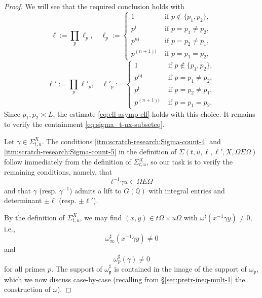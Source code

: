\documentclass[reqno]{amsart}
\theoremstyle{plain} \newtheorem{theorem} {Theorem}
\theoremstyle{definition} \newtheorem{definition} [theorem] {Definition}
\theoremstyle{itplain} %
\numberwithin{equation}{section}
\numberwithin{theorem}{section}
\begin{document}
\begin{proof}
  We will see that the required conclusion holds with
  \begin{equation*}
    \ell := \prod_p \ell_p, \quad
    \ell_p := \begin{cases}
      1 & \text{ if } p \notin \{p_1, p_2\}, \\
      p^{\mathfrak{j}} & \text{ if } p = p_1 \neq p _2, \\
      p ^{n \mathfrak{j} } &  \text{ if } p = p_2 \neq p_1, \\
      p ^{(n + 1) \mathfrak{j} } &  \text{ if } p = p_1 = p_2,
    \end{cases}
  \end{equation*}
  \begin{equation*}
    \ell ' := \prod_p \ell '_p, \quad
    \ell'_p := \begin{cases}
      1 & \text{ if } p \notin \{p_1, p_2\}, \\
      p^{n\mathfrak{j}} & \text{ if } p = p_1 \neq p _2, \\
      p ^{\mathfrak{j} } &  \text{ if } p = p_2 \neq p_1, \\
      p ^{(n + 1) \mathfrak{j} } &  \text{ if } p = p_1 = p_2.
    \end{cases}
  \end{equation*}
  Since $p_1, p_2 \asymp L$, the estimate \eqref{eq:ell-asymp-ell} holds with this choice.  It remains to verify the containment \eqref{eq:sigma_t-ux-subseteq}.
  
  Let $\gamma \in \Sigma_{t,u}^X$.  The conditions \eqref{itm:scratch-research:Sigma-count-4} and \eqref{itm:scratch-research:Sigma-count-5} in the definition of $\Sigma(t,u,\ell, \ell', X, \Omega E \Omega)$ follow immediately from the definition of $\Sigma_{t,u}^X$, so our task is to verify the remaining conditions, namely, that
  \begin{equation}\label{eq:t-1-gamma}
    t^{-1} \gamma u \in \Omega  E \Omega 
  \end{equation}
  and that $\gamma$ (resp. $\gamma^{-1}$) admits a lift to $G(\mathbb{Q})$ with integral entries and determinant $\pm \ell$ (resp. $\pm \ell '$).

  By the definition of $\Sigma_{t,u}^X$, we may find $(x,y) \in t \Omega \times u \Omega$ with $\omega^\sharp(x^{-1} \gamma y) \neq 0$, i.e.,
  \begin{equation}\label{eq:omega_infty-sharp-x}
    \omega_\infty ^\sharp (x^{-1} \gamma y) \neq 0
  \end{equation}
  and
  \begin{equation}\label{eq:omega_p-sharp-gamma}
    \omega_p ^\sharp (\gamma ) \neq 0
  \end{equation}
  for all primes $p$.  The support of $\omega_\mathfrak{p} ^\sharp$ is contained in the image of the support of $\omega_\mathfrak{p}$, which we now discuss case-by-case (recalling from \S\ref{sec:pretr-ineq-mult-1} the construction of $\omega$).


\end{proof}
\end{document}
